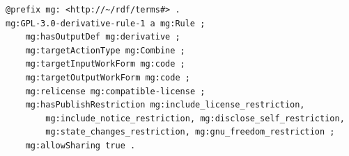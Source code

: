 \begin{tcolorbox}[title=MGLicenseRule.ttl > GPL-3.0-derivative-rule-1, colback=white, colframe=gray, boxrule=0.2mm, boxsep=1mm, left=0mm, right=0mm, top=0.1mm, bottom=0.1mm] %
  \begin{lstlisting}[language=Turtle, breaklines=false, columns=fullflexible, basicstyle=\footnotesize]
@prefix mg: <http://~/rdf/terms#> .
mg:GPL-3.0-derivative-rule-1 a mg:Rule ;
    mg:hasOutputDef mg:derivative ;
    mg:targetActionType mg:Combine ;
    mg:targetInputWorkForm mg:code ;
    mg:targetOutputWorkForm mg:code ;
    mg:relicense mg:compatible-license ;
    mg:hasPublishRestriction mg:include_license_restriction, 
        mg:include_notice_restriction, mg:disclose_self_restriction, 
        mg:state_changes_restriction, mg:gnu_freedom_restriction ;
    mg:allowSharing true .
  \end{lstlisting}
\end{tcolorbox}



